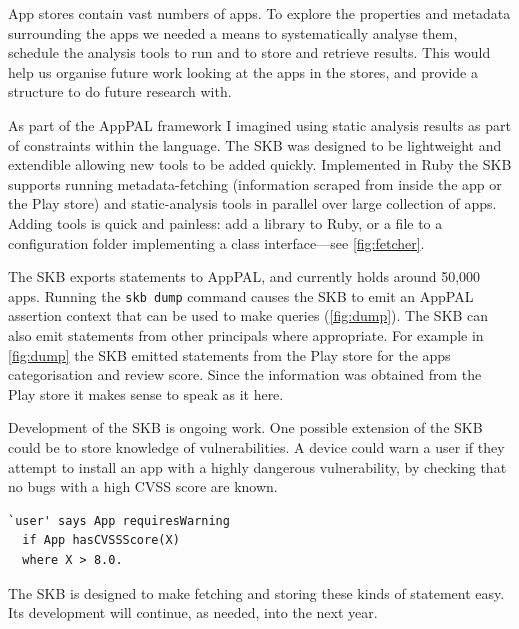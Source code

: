 \documentclass[a4paper]{scrartcl}
\begin{document}
App stores contain vast numbers of apps.
To explore the properties and metadata surrounding the apps we needed a means to systematically analyse them, schedule the analysis tools to run and to store and retrieve results.
This would help us organise future work looking at the apps in the stores, and provide a structure to do future research with.

As part of the AppPAL framework I imagined using static analysis results as part of constraints within the language.
The \ac{SKB} was designed to be lightweight and extendible allowing new tools to be added quickly.
Implemented in Ruby the \ac{SKB} supports running metadata-fetching (information scraped from inside the app or the Play store) and static-analysis tools in parallel over large collection of apps.
Adding tools is quick and painless: add a library to Ruby, or a file to a configuration folder implementing a class interface---see \autoref{fig:fetcher}.

The \ac{SKB} exports statements to AppPAL, and currently holds around 50,000 apps.
Running the \texttt{skb dump} command causes the SKB to emit an AppPAL assertion context that can be used to make queries (\autoref{fig:dump}).
The \ac{SKB} can also emit statements from other principals where appropriate.
For example in \autoref{fig:dump} the \ac{SKB} emitted  statements from the Play store for the apps categorisation and review score.
Since the information was obtained from the Play store it makes sense to speak as it here.

Development of the \ac{SKB} is ongoing work.
One possible extension of the \ac{SKB} could be to store knowledge of vulnerabilities.
A device could warn a user if they attempt to install an app with a highly dangerous vulnerability, by checking that no bugs with a high CVSS score are known.
\begin{lstlisting}
`user' says App requiresWarning
  if App hasCVSSScore(X)
  where X > 8.0.
\end{lstlisting}
The \ac{SKB} is designed to make fetching and storing these kinds of statement easy.
Its development will continue, as needed, into the next year.
\end{document}
